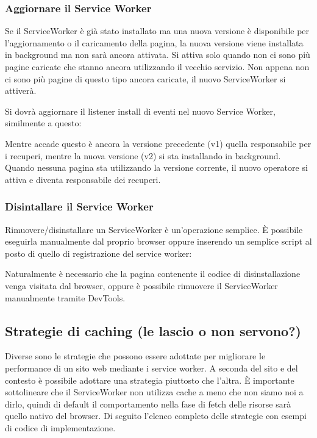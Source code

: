 \documentclass[11pt ,a4paper , twoside , openright ]{article}
\begin{document}
\subsubsection{Aggiornare il Service Worker}
Se il ServiceWorker è già stato installato ma una nuova versione è disponibile per l'aggiornamento o il caricamento della pagina, la nuova versione viene installata in background ma non sarà ancora attivata. Si attiva solo quando non ci sono più pagine caricate che stanno ancora utilizzando il vecchio servizio. Non appena non ci sono più pagine di questo tipo ancora caricate, il nuovo ServiceWorker si attiverà.

Si dovrà aggiornare il listener install di eventi nel nuovo Service Worker, similmente a questo:

Mentre accade questo è ancora la versione precedente (v1) quella responsabile per i recuperi, mentre la nuova versione (v2) si sta installando in background.
Quando nessuna pagina sta utilizzando la versione corrente, il nuovo operatore si attiva e diventa responsabile dei recuperi.

\subsubsection{Disintallare il Service Worker}

Rimuovere/disinstallare un ServiceWorker è un’operazione semplice. È possibile eseguirla manualmente dal proprio browser oppure inserendo un semplice script al posto di quello di registrazione del service worker:

Naturalmente è necessario che la pagina contenente il codice di disinstallazione venga visitata dal browser, oppure è possibile rimuovere il ServiceWorker manualmente tramite DevTools.
\newpage
\subsection{Strategie di caching (le lascio o non servono?)}
Diverse sono le strategie che possono essere adottate per migliorare le performance di un sito web mediante i service worker. A seconda del sito e del contesto è possibile adottare una strategia piuttosto che l’altra.
È importante sottolineare che il ServiceWorker non utilizza cache a meno che non siamo noi a dirlo, quindi di default il comportamento nella fase di fetch delle risorse sarà quello nativo del browser.
Di seguito l’elenco completo delle strategie con esempi di codice di implementazione. 
\end{document}

